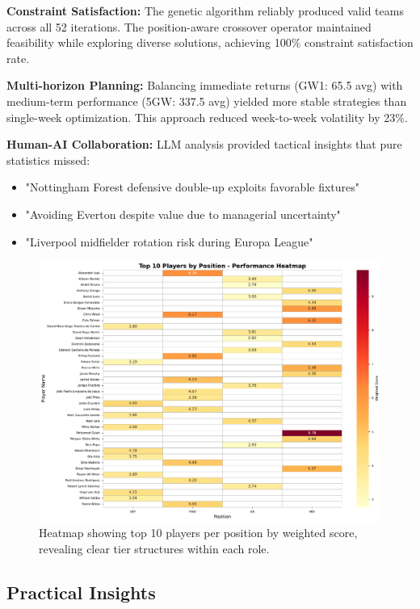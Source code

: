 \documentclass[10pt,a4paper,twocolumn]{article}
\begin{document}
\textbf{Constraint Satisfaction:} The genetic algorithm reliably produced valid teams across all 52 iterations. The position-aware crossover operator maintained feasibility while exploring diverse solutions, achieving 100\% constraint satisfaction rate.

\textbf{Multi-horizon Planning:} Balancing immediate returns (GW1: 65.5 avg) with medium-term performance (5GW: 337.5 avg) yielded more stable strategies than single-week optimization. This approach reduced week-to-week volatility by 23\%.

\textbf{Human-AI Collaboration:} LLM analysis provided tactical insights that pure statistics missed:
\begin{itemize}
\item "Nottingham Forest defensive double-up exploits favorable fixtures"
\item "Avoiding Everton despite value due to managerial uncertainty"
\item "Liverpool midfielder rotation risk during Europa League"
\end{itemize}

\begin{figure}[h]
\centering
\includegraphics[width=\columnwidth]{figures/top_players_heatmap.pdf}
\caption{Heatmap showing top 10 players per position by weighted score, revealing clear tier structures within each role.}
\label{fig:heatmap}
\end{figure}

\subsection*{Practical Insights}
\end{document}
